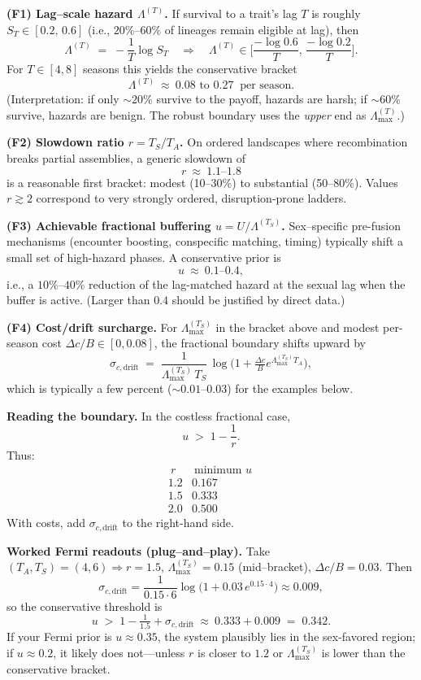 \documentclass[11pt]{article}
\theoremstyle{upright}
\newcommand{\hazT}[1]{\Lambda^{(#1)}}          %
\newcommand{\hazmaxT}[1]{\Lambda^{(#1)}_{\max}}%
\begin{document}
\medskip
\noindent\textbf{(F1) Lag–scale hazard \(\hazT{T}\).}
If survival to a trait’s lag \(T\) is roughly \(S_T\in[0.2,\,0.6]\) (i.e., \(20\%\)–\(60\%\) of lineages remain eligible
at lag), then
\[
\hazT{T} \;=\; -\frac{1}{T}\log S_T
\quad\Rightarrow\quad
\hazT{T}\in\Big[\frac{-\log 0.6}{T},\,\frac{-\log 0.2}{T}\Big].
\]
For \(T\in[4,8]\) seasons this yields the conservative bracket
\[
\hazT{T}\ \approx\ 0.08\text{ to }0.27\ \text{ per season.}
\]
(Interpretation: if only \(\sim 20\%\) survive to the payoff, hazards are harsh; if \(\sim 60\%\) survive, hazards are
benign. The robust boundary uses the \emph{upper} end as \(\hazmaxT{T}\).)

\medskip
\noindent\textbf{(F2) Slowdown ratio \(r=T_S/T_A\).}
On ordered landscapes where recombination breaks partial assemblies, a generic slowdown of
\[
r\ \approx\ 1.1\text{–}1.8
\]
is a reasonable first bracket: modest (10–30\%) to substantial (50–80\%). Values \(r\!\gtrsim\!2\) correspond to
very strongly ordered, disruption-prone ladders.

\medskip
\noindent\textbf{(F3) Achievable fractional buffering \(u=U/\hazT{T_S}\).}
Sex–specific pre-fusion mechanisms (encounter boosting, conspecific matching, timing) typically shift a small set of
high-hazard phases. A conservative prior is
\[
u\ \approx\ 0.1\text{–}0.4,
\]
i.e., a \(10\%\)–\(40\%\) reduction of the lag-matched hazard at the sexual lag when the buffer is active. (Larger than
\(0.4\) should be justified by direct data.)

\medskip
\noindent\textbf{(F4) Cost/drift surcharge.}
For \(\hazmaxT{T_S}\) in the bracket above and modest per-season cost \(\Delta c/B\in[0,0.08]\),
the fractional boundary shifts upward by
\[
\sigma_{c,\text{drift}} \;=\; \frac{1}{\hazmaxT{T_S}\,T_S}\,
\log\!\Big(1+\tfrac{\Delta c}{B}e^{\hazmaxT{T_S}T_A}\Big),
\]
which is typically a few percent (\(\sim\!0.01\)–\(0.03\)) for the examples below.

\medskip
\noindent\textbf{Reading the boundary.} In the costless fractional case,
\[
u\;>\;1-\frac{1}{r}.
\]
Thus:
\[
\begin{array}{c|c}
\ r\ &\ \text{minimum }u\ \\
\hline
1.2 & 0.167\\
1.5 & 0.333\\
2.0 & 0.500
\end{array}
\]
With costs, add \(\sigma_{c,\text{drift}}\) to the right-hand side.

\medskip
\noindent\textbf{Worked Fermi readouts (plug–and–play).}
Take \((T_A,T_S)=(4,6)\Rightarrow r=1.5\), \(\hazmaxT{T_S}=0.15\) (mid–bracket), \(\Delta c/B=0.03\).
Then
\[
\sigma_{c,\text{drift}}=\frac{1}{0.15\cdot 6}\log\!\Big(1+0.03\,e^{0.15\cdot 4}\Big)\approx 0.009,
\]
so the conservative threshold is
\[
u\;>\;1-\tfrac{1}{1.5}+\sigma_{c,\text{drift}}\ \approx\ 0.333+0.009\;=\;0.342.
\]
If your Fermi prior is \(u\approx 0.35\), the system plausibly lies in the sex-favored region; if \(u\approx 0.2\),
it likely does not—unless \(r\) is closer to \(1.2\) or \(\hazmaxT{T_S}\) is lower than the conservative bracket.
\end{document}
